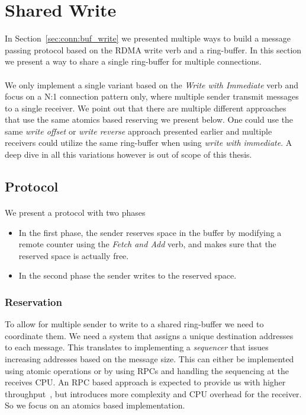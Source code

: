 \section{Shared Write} \label{sec:conn:shared_write}
In Section~\ref{sec:conn:buf_write} we presented multiple ways to build a message passing protocol based on the 
RDMA write verb and a ring-buffer. In this section we present a way to share a single ring-buffer for multiple connections.

\paragraph{} We only implement a single variant based on the \emph{Write with Immediate} verb and focus on a N:1 connection pattern only,
where multiple sender transmit messages to a single receiver.
We point out that there are multiple different approaches that use the same atomics based reserving we present below. One
could use the same \emph{write offset} or \emph{write reverse} approach presented earlier and multiple receivers could
utilize the same ring-buffer when using \emph{write with immediate}. A deep dive in all this variations however is out
of scope of this thesis.

\subsection{Protocol}

\paragraph{} We present a protocol with two phases

\begin{itemize}
  \item In the first phase, the sender reserves space in the buffer by modifying a remote counter using 
    the \emph{Fetch and Add} verb, and makes sure that the reserved space is actually free.
  \item In the second phase the sender writes to the reserved space.
\end{itemize}
\subsubsection{Reservation}
To allow for multiple sender to write to a shared ring-buffer we need to coordinate them. We need a system that 
assigns a unique destination addresses to each message. This translates to implementing a \emph{sequencer} that issues
increasing addresses based on the message size. This can either be implemented using atomic operations or by using RPCs
and handling the sequencing at the receives CPU. An RPC based approach is expected to provide us with higher 
throughput~\cite{anuj-guide}, but introduces more complexity and CPU overhead for the receiver. So we focus on an atomics based 
implementation.

